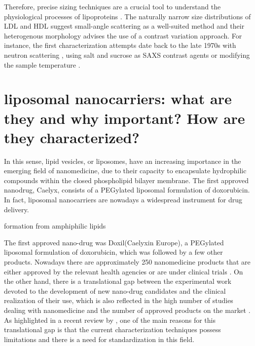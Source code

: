 Therefore, precise sizing techniques are a crucial tool to understand the physiological processes of lipoproteins \citep{german_lipoproteins:_2006}. The naturally narrow size distributions of LDL and HDL suggest small-angle scattering as a well-suited method and their heterogenous morphology advises the use of a contrast variation approach. For instance, the first characterization attempts date back to the late 1970s with neutron scattering \citep{stuhrmann_neutron_1975}, using salt \citep{tardieu_structure_1976} and sucrose \citep{muller_structure_1978} as SAXS contrast agents or modifying the sample temperature \citep{laggner_molecular_1977,luzzati_structure_1979}. 

\section{liposomal nanocarriers: what are they and why important? How are they characterized?}

In this sense, lipid vesicles, or liposomes, have an increasing importance in the emerging field of nanomedicine, due to their capacity to encapsulate hydrophilic compounds within the closed phospholipid bilayer membrane. The first approved nanodrug, Caelyx\textregistered, consists of a PEGylated liposomal formulation of doxorubicin\citep{barenholz_doxil_2012}. In fact, liposomal nanocarriers are nowadays a widespread instrument for drug delivery\citep{perez-herrero_advanced_2015}.

formation from amphiphilic lipids

The first approved nano-drug was Doxil\textregistered (Caelyx\textregistered in Europe), a PEGylated liposomal formulation of doxorubicin, which was followed by a few other products\citep{yeh_clinical_2011,barenholz_doxil_2012}. Nowadays there are approximately 250 nanomedicine products that are either approved by the relevant health agencies or are under clinical trials \citep{etheridge_big_2013}. On the other hand, there is a translational gap between the experimental work devoted to the development of new nano-drug candidates and the clinical realization of their use, which is also reflected in the high number of studies dealing with nanomedicine and the number of approved products on the market \citep{khorasani_closing_2014, venditto_cancer_2013}. As highlighted in a recent review by \citep{khorasani_closing_2014}, one of the main reasons for this translational gap is that the current characterization techniques possess limitations and there is a need for standardization in this field.

